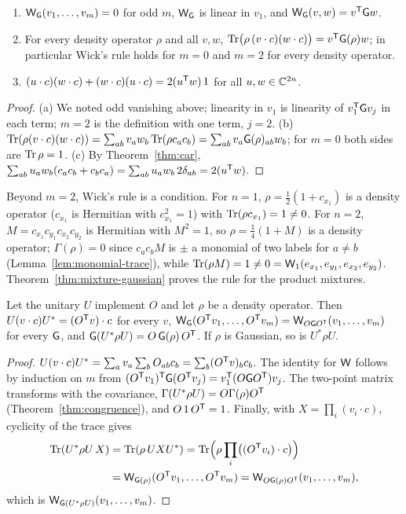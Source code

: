 \begin{lemma}\label{lem:wick-basic}
\begin{enumerate}
\item[(a)] $\mathsf W_\mathsf G(v_1,\ldots,v_m)=0$ for odd $m$, $\mathsf W_\mathsf G$ is linear in $v_1$, and
$\mathsf W_\mathsf G(v,w)=v^{\mathsf T}\mathsf G w$.
\item[(b)] For every density operator $\rho$ and all $v,w$,
$\operatorname{Tr}\bigl(\rho\,(v\cdot c)(w\cdot c)\bigr)=v^{\mathsf T}\mathsf G(\rho)w$; in particular Wick's rule holds
for $m=0$ and $m=2$ for every density operator.
\item[(c)] $(u\cdot c)(w\cdot c)+(w\cdot c)(u\cdot c)=2(u^{\mathsf T}w)\,1$ for all $u,w\in\mathbb C^{2n}$.
\end{enumerate}
\end{lemma}
\begin{proof}
(a) We noted odd vanishing above; linearity in $v_1$ is linearity of $v_1^{\mathsf T}\mathsf G v_j$ in each
term; $m=2$ is the definition with one term, $j=2$.
(b) $\operatorname{Tr}(\rho(v\cdot c)(w\cdot c))=\sum_{ab}v_aw_b\operatorname{Tr}(\rho c_ac_b)=\sum_{ab}v_a\mathsf G(\rho)_{ab}w_b$;
for $m=0$ both sides are $\operatorname{Tr}\rho=1$.
(c) By Theorem~\ref{thm:car},
$\sum_{ab}u_aw_b(c_ac_b+c_bc_a)=\sum_{ab}u_aw_b\,2\delta_{ab}=2(u^{\mathsf T}w)$.
\end{proof}
\begin{remark}\label{rem:wick-condition}
Beyond $m=2$, Wick's rule is a condition. For $n=1$, $\rho=\tfrac12(1+c_{x_1})$ is a
density operator ($c_{x_1}$ is Hermitian with $c_{x_1}^2=1$) with $\operatorname{Tr}(\rho c_{x_1})=1\neq0$. For
$n=2$, $M=c_{x_1}c_{y_1}c_{x_2}c_{y_2}$ is Hermitian with $M^2=1$, so
$\rho=\tfrac14(1+M)$ is a density operator; $\Gamma(\rho)=0$ since $c_ac_bM$ is $\pm$ a monomial
of two labels for $a\neq b$ (Lemma~\ref{lem:monomial-trace}), while
$\operatorname{Tr}(\rho M)=1\neq0=\mathsf W_1(e_{x_1},e_{y_1},e_{x_2},e_{y_2})$. Theorem~\ref{thm:mixture-gaussian}
proves the rule for the product mixtures.
\end{remark}

\begin{theorem}\label{thm:transport}
Let the unitary $U$ implement $O$ and let $\rho$ be a density operator. Then
$U(v\cdot c)U^*=(O^{\mathsf T}v)\cdot c$ for every $v$,
$\mathsf W_\mathsf G(O^{\mathsf T}v_1,\ldots,O^{\mathsf T}v_m)=\mathsf W_{O\mathsf G O^{\mathsf T}}(v_1,\ldots,v_m)$ for every $\mathsf G$, and
$\mathsf G(U^*\rho U)=O\,\mathsf G(\rho)\,O^{\mathsf T}$. If $\rho$ is Gaussian, so is $U^*\rho U$.
\end{theorem}
\begin{proof}
$U(v\cdot c)U^*=\sum_av_a\sum_bO_{ab}c_b=\sum_b(O^{\mathsf T}v)_bc_b$. The identity for $\mathsf W$ follows
by induction on $m$ from $(O^{\mathsf T}v_1)^{\mathsf T}\mathsf G(O^{\mathsf T}v_j)=v_1^{\mathsf T}(O\mathsf G O^{\mathsf T})v_j$. The two-point
matrix transforms with the covariance, $\Gamma(U^*\rho U)=O\Gamma(\rho)O^{\mathsf T}$
(Theorem~\ref{thm:congruence}), and $O\,1\,O^{\mathsf T}=1$. Finally, with $X=\prod_i(v_i\cdot c)$,
cyclicity of the trace gives
\begin{align*}
 \operatorname{Tr}(U^*\rho U\,X)&=\operatorname{Tr}(\rho\,UXU^*)=\operatorname{Tr}\Bigl(\rho\prod_i\bigl((O^{\mathsf T}v_i)\cdot c\bigr)\Bigr)\\
 &=\mathsf W_{\mathsf G(\rho)}(O^{\mathsf T}v_1,\ldots,O^{\mathsf T}v_m)=\mathsf W_{O\mathsf G(\rho)O^{\mathsf T}}(v_1,\ldots,v_m),
\end{align*}
which is $\mathsf W_{\mathsf G(U^*\rho U)}(v_1,\ldots,v_m)$.
\end{proof}

